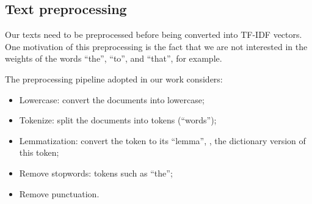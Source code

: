 \subsection{Text preprocessing}

    Our texts need to be preprocessed before being converted into TF-IDF vectors. One motivation of this preprocessing is the fact that we are not interested in the weights of the words ``the'', ``to'', and ``that'', for example.

    The preprocessing pipeline adopted in our work considers:
    \begin{itemize}
    \item Lowercase: convert the documents into lowercase;
    \item Tokenize: split the documents into tokens (``words'');
    \item Lemmatization: convert the token to its ``lemma'', \ie, the dictionary version of this token;
    \item Remove stopwords: tokens such as ``the'';
    \item Remove punctuation.
    \end{itemize}
